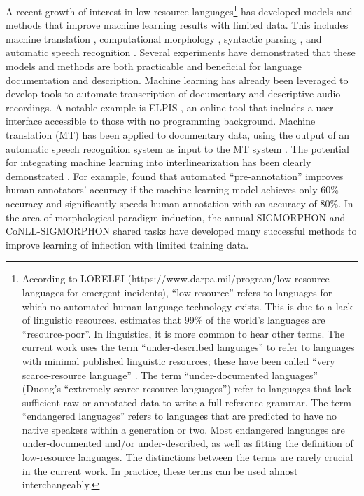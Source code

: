 A recent growth of interest in low-resource languages\footnote{According to LORELEI (https://www.darpa.mil/program/low-resource-languages-for-emergent-incidents), ``low-resource'' refers to languages for which no automated human language technology exists. This is due to a lack of linguistic resources. \citet{szymanski_morphological_2012} estimates that 99\% of the world's languages are ``resource-poor''. In linguistics, it is more common to hear other terms. The current work uses the term ``under-described languages'' to refer to languages with minimal published linguistic resources; these have been called ``very scarce-resource language'' \citep{duong_natural_2017}. The term ``under-documented languages'' (Duong's ``extremely scarce-resource languages'') refer to languages that lack sufficient raw or annotated data to write a full reference grammar. The term ``endangered languages'' refers to languages that are predicted to have no native speakers within a generation or two. Most endangered languages are under-documented and/or under-described, as well as fitting the definition of low-resource languages. The distinctions between the terms are rarely crucial in the current work. In practice, these terms can be used almost interchangeably.} 
has developed models and methods that improve machine learning results with limited data. This includes machine translation \citep{abbott_towards_2018,gu_universal_2018,shearing_improving_2018,al_mumin_neural_2019,duh_benchmarking_2020}, computational morphology \citep{ruokolainen_supervised_2013,baumann_using_2014,micher_improving_2017,moeller_improving_2019}, syntactic parsing \citep{baldridge_learning_2013,duong-etal-2015-low,duong_natural_2017}, and automatic speech recognition \citep{adams_automatic_2017,anastasopoulos_computational_2019}. Several experiments have demonstrated that these models and methods are both practicable and beneficial for language documentation and description. Machine learning has already been leveraged to develop tools to automate transcription of documentary and descriptive audio recordings. A notable example is ELPIS \citep{foley_elpis_2018}, an online tool that includes a user interface accessible to those with no programming background. Machine translation (MT) has been applied to documentary data, using the output of an automatic speech recognition system as input to the MT system \citep{anastasopoulos_unsupervised_2016,duong_attentional_2016}. The potential for integrating machine learning into interlinearization has been clearly demonstrated \citep{baldridge_how_2009,palmer_semi-automated_2009,palmer_computational_2010,xia_enriching_2016}. For example, \citet{felt_improving_2012} found that automated ``pre-annotation'' improves human annotators' accuracy if the machine learning model achieves only 60\% accuracy and significantly speeds human annotation with an accuracy of 80\%. In the area of morphological paradigm induction, the annual SIGMORPHON and CoNLL-SIGMORPHON shared tasks \citep{cotterell_sigmorphon_2016,cotterell_conll-sigmorphon_2017,cotterell_conllsigmorphon_2018,mccarthy-etal-2019-sigmorphon,nicolai_sigmorphonproceedings_2020,sigmorphonproceedings_2021} have developed many successful methods to improve learning of inflection with limited training data. 

